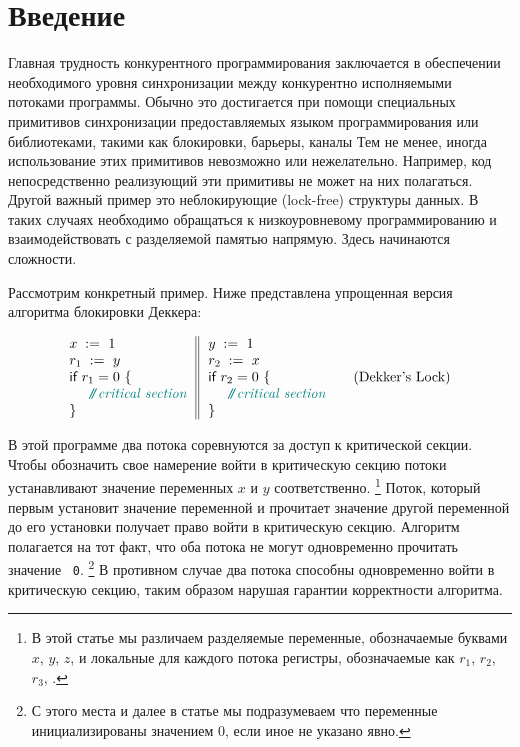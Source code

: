 \section{Введение}
\label{sec:intro}

Главная трудность конкурентного программирования 
заключается в обеспечении необходимого уровня 
синхронизации между конкурентно исполняемыми потоками программы. 
Обычно это достигается при помощи специальных 
примитивов синхронизации предоставляемых 
языком программирования или библиотеками, 
такими как блокировки, барьеры, каналы \etc 
Тем не менее, иногда использование этих примитивов 
невозможно или нежелательно. 
Например, код непосредственно реализующий эти 
примитивы не может на них полагаться. 
Другой важный пример это неблокирующие (lock-free) структуры данных.
В таких случаях необходимо обращаться к 
низкоуровневому программированию и 
взаимодействовать с разделяемой памятью напрямую.
Здесь начинаются сложности. 

Рассмотрим конкретный пример.
Ниже представлена упрощенная версия 
алгоритма блокировки Деккера:

\begin{equation*}
\inarrII{
  \writeInst{}{x}{1} \\
  \readInst{}{r_1}{y}  \\
  \kw{if} {r_1 = 0} ~\{ \\
  ~~ \comment{critical section} \\
  \}
}{
  \writeInst{}{y}{1} \\
  \readInst{}{r_2}{x}  \\
  \kw{if} {r_2 = 0} ~\{ \\
  ~~ \comment{critical section} \\
  \}
}
\tag{Dekker's Lock}\label{ex:Dekker}
\end{equation*}

В этой программе два потока соревнуются за доступ к критической секции.
Чтобы обозначить свое намерение войти в критическую секцию
потоки устанавливают значение переменных $x$ и $y$ соответственно.%
\footnote{В этой статье мы различаем разделяемые переменные,
обозначаемые буквами $x$, $y$, $z$, и 
локальные для каждого потока регистры, 
обозначаемые как $r_1$, $r_2$, $r_3$, \etc.}
Поток, который первым установит значение переменной и 
прочитает значение другой переменной до его установки
получает право войти в критическую секцию.
Алгоритм полагается на тот факт, что оба 
потока не могут одновременно прочитать значение ~\texttt{0}.%
\footnote{С этого места и далее в статье мы подразумеваем 
что переменные инициализированы значением 0, если иное не указано явно.}
В противном случае два потока способны одновременно 
войти в критическую секцию, таким образом нарушая 
гарантии корректности алгоритма. 

